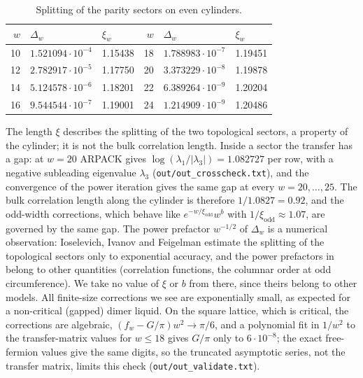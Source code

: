 \documentclass[11pt]{amsart}
\theoremstyle{definition}
\theoremstyle{remark}
\newcommand{\file}[1]{\texttt{#1}}
\begin{document}
\begin{table}[ht]
\caption{Splitting of the parity sectors on even cylinders.}\label{tab:z2}
\begin{tabular}{rll@{\qquad}rll}
\toprule
$w$ & $\Delta_w$ & $\xi_w$ & $w$ & $\Delta_w$ & $\xi_w$ \\
\midrule
10 & $1.521094\cdot10^{-4}$ & 1.15438 & 18 & $1.788983\cdot10^{-7}$ & 1.19451 \\
12 & $2.782917\cdot10^{-5}$ & 1.17750 & 20 & $3.373229\cdot10^{-8}$ & 1.19878 \\
14 & $5.124578\cdot10^{-6}$ & 1.18201 & 22 & $6.389264\cdot10^{-9}$ & 1.20204 \\
16 & $9.544544\cdot10^{-7}$ & 1.19001 & 24 & $1.214909\cdot10^{-9}$ & 1.20486 \\
\bottomrule
\end{tabular}
\end{table}

The length $\xi$ describes the splitting of the two topological sectors, a property of the
cylinder; it is not the bulk correlation length. Inside a sector the transfer has a gap: at
$w = 20$ ARPACK gives $\log(\lambda_1/|\lambda_3|) = 1.082727$ per row, with a negative subleading
eigenvalue $\lambda_3$ (\file{out/out\_crosscheck.txt}), and the convergence of the power iteration
gives the same gap at every $w = 20, \dots, 25$. The bulk correlation length along the cylinder is
therefore $1/1.0827 = 0.92$, and the odd-width corrections, which behave like
$e^{-w/\xi_{\mathrm{odd}}} w^b$ with $1/\xi_{\mathrm{odd}} \approx 1.07$, are governed by the same
gap. The power prefactor $w^{-1/2}$ of $\Delta_w$ is a numerical observation: Ioselevich, Ivanov and
Feigelman \cite{ioselevich2002} estimate the splitting of the topological sectors only to
exponential accuracy, and the power prefactors in \cite{ioselevich2002, yaokivelson2012} belong
to other quantities (correlation functions, the columnar order at odd circumference). We take no
value of $\xi$ or $b$ from there, since theirs belong to other models. All finite-size
corrections we see are exponentially small, as expected for a non-critical (gapped) dimer liquid.
On the square lattice, which is critical, the corrections are algebraic,
$(f_w - G/\pi)w^2 \to \pi/6$, and a polynomial fit in $1/w^2$ to the transfer-matrix values for
$w \le 18$ gives $G/\pi$ only to $6\cdot10^{-8}$; the exact free-fermion values give the same
digits, so the truncated asymptotic series, not the transfer matrix, limits this check
(\file{out/out\_validate.txt}).
\end{document}
